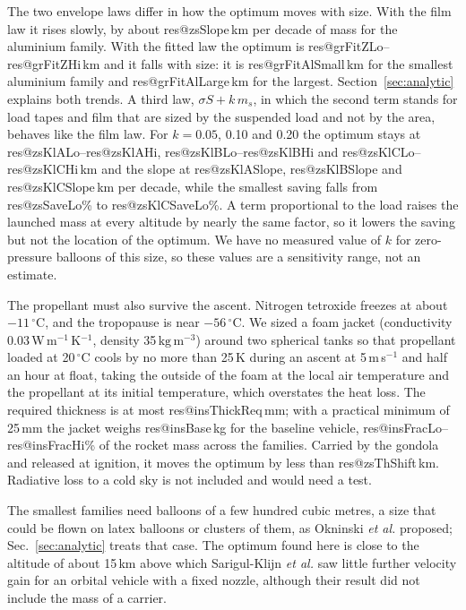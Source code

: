 \documentclass[11pt,a4paper]{article}
\makeatletter
\newcommand{\R}[1]{\csname res@#1\endcsname}
\newcommand{\kgm}{\,\mathrm{kg\,m^{-3}}}
\makeatother
\begin{document}
The two envelope laws differ in how the optimum moves with size. With the film law it rises slowly, by about \R{zsSlope}\,km per decade of mass for the aluminium family. With the fitted law the optimum is \R{grFitZLo}--\R{grFitZHi}\,km and it falls with size: it is \R{grFitAlSmall}\,km for the smallest aluminium family and \R{grFitAlLarge}\,km for the largest. Section~\ref{sec:analytic} explains both trends. A third law, $\sigma S+k\,m_s$, in which the second term stands for load tapes and film that are sized by the suspended load and not by the area, behaves like the film law. For $k=0.05$, 0.10 and 0.20 the optimum stays at \R{zsKlALo}--\R{zsKlAHi}, \R{zsKlBLo}--\R{zsKlBHi} and \R{zsKlCLo}--\R{zsKlCHi}\,km and the slope at \R{zsKlASlope}, \R{zsKlBSlope} and \R{zsKlCSlope}\,km per decade, while the smallest saving falls from \R{zsSaveLo}\% to \R{zsKlCSaveLo}\%. A term proportional to the load raises the launched mass at every altitude by nearly the same factor, so it lowers the saving but not the location of the optimum. We have no measured value of $k$ for zero-pressure balloons of this size, so these values are a sensitivity range, not an estimate.

The propellant must also survive the ascent. Nitrogen tetroxide freezes at about $-11\,^\circ$C, and the tropopause is near $-56\,^\circ$C. We sized a foam jacket (conductivity 0.03\,W\,m$^{-1}$\,K$^{-1}$, density 35$\kgm$) around two spherical tanks so that propellant loaded at 20\,$^\circ$C cools by no more than 25\,K during an ascent at 5\,m\,s$^{-1}$ and half an hour at float, taking the outside of the foam at the local air temperature and the propellant at its initial temperature, which overstates the heat loss. The required thickness is at most \R{insThickReq}\,mm; with a practical minimum of 25\,mm the jacket weighs \R{insBase}\,kg for the baseline vehicle, \R{insFracLo}--\R{insFracHi}\% of the rocket mass across the families. Carried by the gondola and released at ignition, it moves the optimum by less than \R{zsThShift}\,km. Radiative loss to a cold sky is not included and would need a test.

The smallest families need balloons of a few hundred cubic metres, a size that could be flown on latex balloons or clusters of them, as Okninski \emph{et al.} \cite{okninski2016} proposed; Sec.~\ref{sec:analytic} treats that case. The optimum found here is close to the altitude of about 15\,km above which Sarigul-Klijn \emph{et al.} \cite{sarigul2005} saw little further velocity gain for an orbital vehicle with a fixed nozzle, although their result did not include the mass of a carrier.
\end{document}
